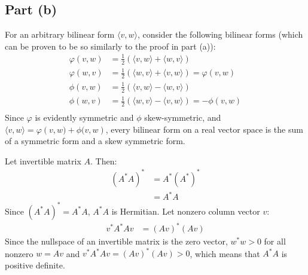 \documentclass{article}
\begin{document}
\subsection*{Part (b)}
For an arbitrary bilinear form $\langle v, w \rangle$, consider the following bilinear forms (which can be proven to be so similarly to the proof in part (a)):
\begin{equation}
    \begin{split}
        \varphi\left(v, w\right) & = \frac{1}{2}\left(\langle v, w \rangle + \langle w, v \rangle\right) \\
        \varphi\left(w, v\right) & = \frac{1}{2}\left(\langle  w, v \rangle + \langle v, w  \rangle\right) = \varphi\left(v, w\right) \\
        \phi\left(v, w\right) & = \frac{1}{2}\left(\langle  v, w \rangle - \langle w, v  \rangle\right) \\
        \phi\left(w, v\right) & = \frac{1}{2}\left(\langle  w, v \rangle - \langle v, w  \rangle\right) = -\phi\left(v, w\right) \\
    \end{split}
\end{equation}
Since $\varphi$ is evidently symmetric and $\phi$ skew-symmetric, and $\langle v, w\rangle = \varphi\left(v, w) + \phi(v, w\right)$, every bilinear form on a real vector space is the sum of a symmetric form and a skew symmetric form.

\clearpage

Let invertible matrix $A$. Then:
\begin{equation}
    \begin{split}
        \left(A^*A\right)^* & = A^*\left(A^*\right)^* \\
        & = A^*A
    \end{split}
\end{equation}
Since $\left(A^*A\right)^* = A^*A$, $A^*A$ is Hermitian. Let nonzero column vector $v$:
\begin{equation}
    \begin{split}
        v^*A^*Av & = \left(Av\right)^*\left(Av\right)
    \end{split}
\end{equation}
Since the nullspace of an invertible matrix is the zero vector, $w^*w > 0$ for all nonzero $w = Av$ and $v^*A^*Av = \left(Av\right)^*\left(Av\right) > 0$, which means that $A^*A$ is positive definite.

\clearpage
\end{document}

